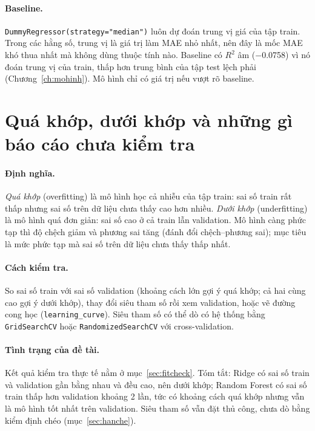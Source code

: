 \paragraph{Baseline.} \texttt{DummyRegressor(strategy="median")} luôn dự đoán trung vị giá của tập train. Trong các hằng số, trung vị là giá trị làm MAE nhỏ nhất, nên đây là mốc MAE khó thua nhất mà không dùng thuộc tính nào. Baseline có $R^2$ âm ($-$0.0758) vì nó đoán trung vị của train, thấp hơn trung bình của tập test lệch phải (Chương~\ref{ch:mohinh}). Mô hình chỉ có giá trị nếu vượt rõ baseline.

\section{Quá khớp, dưới khớp và những gì báo cáo chưa kiểm tra}\label{sec:quaykhop}
\paragraph{Định nghĩa.} \emph{Quá khớp} (overfitting) là mô hình học cả nhiễu của tập train: sai số train rất thấp nhưng sai số trên dữ liệu chưa thấy cao hơn nhiều. \emph{Dưới khớp} (underfitting) là mô hình quá đơn giản: sai số cao ở cả train lẫn validation. Mô hình càng phức tạp thì độ chệch giảm và phương sai tăng (đánh đổi chệch--phương sai); mục tiêu là mức phức tạp mà sai số trên dữ liệu chưa thấy thấp nhất.

\paragraph{Cách kiểm tra.} So sai số train với sai số validation (khoảng cách lớn gợi ý quá khớp; cả hai cùng cao gợi ý dưới khớp), thay đổi siêu tham số rồi xem validation, hoặc vẽ đường cong học (\texttt{learning\_curve}). Siêu tham số có thể dò có hệ thống bằng \texttt{GridSearchCV} hoặc \texttt{RandomizedSearchCV} với cross-validation.

\paragraph{Tình trạng của đề tài.} Kết quả kiểm tra thực tế nằm ở mục~\ref{sec:fitcheck}. Tóm tắt: Ridge có sai số train và validation gần bằng nhau và đều cao, nên dưới khớp; Random Forest có sai số train thấp hơn validation khoảng 2 lần, tức có khoảng cách quá khớp nhưng vẫn là mô hình tốt nhất trên validation. Siêu tham số vẫn đặt thủ công, chưa dò bằng kiểm định chéo (mục~\ref{sec:hanche}).

